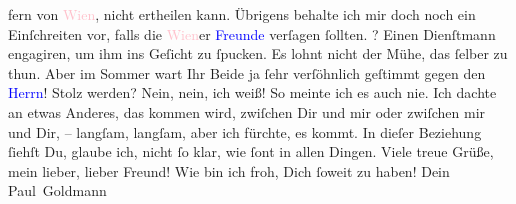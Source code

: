                    fern von \textcolor{pink}{Wien}{}\ledrightnote{\textcolor{pink}{Wien}}, nicht ertheilen kann. Übrigens behalte ich mir doch noch ein
               Einſchreiten vor, falls die \textcolor{pink}{Wien}{}\ledrightnote{\textcolor{pink}{Wien}}er \textcolor{blue}{Freunde}{} verſagen
               ſollten.\pend
           \pstart
           \label{K_L02753-4v}\label{K_L02753-4h}? Einen Dienſtmann engagiren, um ihm ins Geſicht zu  ſpucken. Es lohnt nicht der Mühe, das ſelber zu thun. Aber im Sommer wart Ihr
               Beide ja ſehr verſöhnlich geſtimmt gegen den \textcolor{blue}{Herrn}{}!{\dotssix}\pend
           \pstart
           {\pb}Stolz werden? Nein, nein, ich  weiß! So meinte ich es auch nie. Ich dachte an
               etwas Anderes, das kommen wird, zwiſchen Dir und mir oder zwiſchen mir und Dir, –
               langſam, langſam, aber ich fürchte, es kommt. In dieſer Beziehung ſiehſt Du, glaube
               ich,  nicht ſo klar, wie ſont in allen
               Dingen.\pend
           \pstart
           Viele treue Grüße, mein lieber, lieber Freund! Wie bin ich froh, Dich ſoweit zu
               haben!\pend
           \pstart Dein \spacefill\mbox{Paul Goldmann}\pend{}\endnumbering{}\begin{anhang}\end{anhang}
      